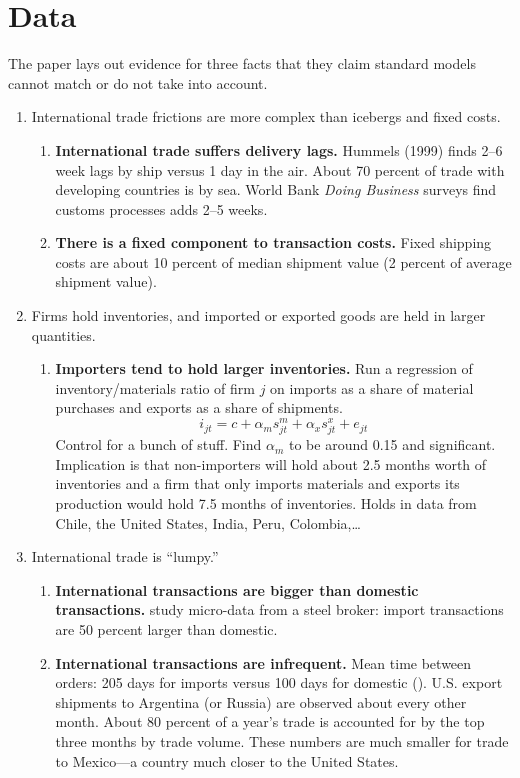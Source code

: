 \documentclass[11pt, pdftex]{article}
\begin{document}
\section{Data}
The paper lays out evidence for three facts that they claim standard models cannot match or do not take into account.
\begin{enumerate}
\item International trade frictions are more complex than icebergs and fixed costs.
\begin{enumerate}
  \item \textbf{International trade suffers delivery lags.} Hummels (1999) finds 2--6 week lags by ship versus 1 day in the air. About 70 percent of trade with developing countries is by sea. World Bank \textit{Doing Business} surveys find customs  processes adds 2--5 weeks.
      \item \textbf{There is a fixed component to transaction costs.} Fixed shipping costs are about 10 percent of median shipment value (2 percent of average shipment value).
\end{enumerate}

\item Firms hold inventories, and imported or exported goods are held in larger quantities.
\begin{enumerate}
  \item \textbf{Importers tend to hold larger inventories.} Run a regression of inventory/materials ratio of firm $j$ on imports as a share of material purchases and exports as a share of shipments.
  \begin{equation}\label{}
    i_{jt} = c+\alpha_ms^m_{jt}+\alpha_xs^x_{jt}+e_{jt}
  \end{equation}
  Control for a bunch of stuff. Find $\alpha_m$ to be around 0.15 and significant. Implication is that non-importers will hold about 2.5 months worth of inventories and a firm that only imports materials and exports its production would hold 7.5 months of inventories. Holds in data from Chile, the United States, India, Peru, Colombia,\ldots
\end{enumerate}

\item International trade is ``lumpy.''
\begin{enumerate}
  \item  \textbf{International transactions are bigger than domestic transactions.} \citet{hall2003steel} study micro-data from a steel broker: import transactions are 50 percent larger than domestic.
  \item \textbf{International transactions are infrequent.} Mean time between orders: 205 days for imports versus 100 days for domestic (\cite{hall2003steel}). U.S. export shipments to Argentina (or Russia) are observed about every other month. About 80 percent of a year's trade is accounted for by the top three months by trade volume. These numbers are much smaller for trade to Mexico---a country much closer to the United States.
\end{enumerate}

\end{enumerate}
\end{document}
